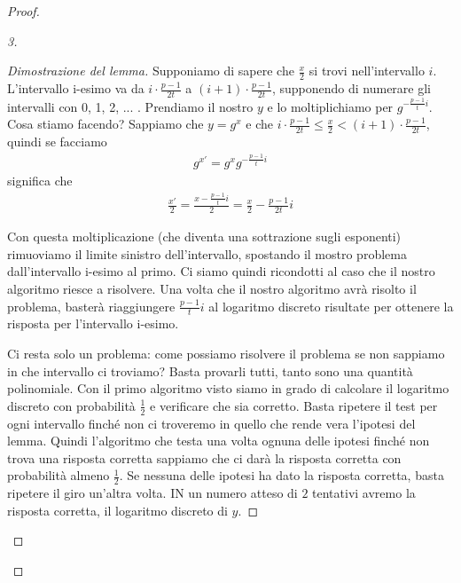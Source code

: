\begin{proof}
\begin{proof}[3]
\begin{proof}[Dimostrazione del lemma]
Supponiamo di sapere che $\frac{x}{2}$ si trovi nell'intervallo $i$. L'intervallo i-esimo va da $i \cdot \frac{p-1}{2t}$ a $(i+1) \cdot \frac{p-1}{2t}$, supponendo di numerare gli intervalli con 0, 1, 2, ... . Prendiamo il nostro $y$ e lo moltiplichiamo per $g^{-\frac{p-1}{t}i}$. Cosa stiamo facendo? Sappiamo che $y=g^x$ e che $i \cdot \frac{p-1}{2t} \le \frac{x}{2} < (i+1) \cdot \frac{p-1}{2t}$, quindi se facciamo 
\begin{align*}
    g^{x'} = g^x g^{-\frac{p-1}{t}i}
\end{align*}
\noindent significa che
\begin{align*}
    \frac{x'}{2} = \frac{x - \frac{p-1}{t}i}{2} = \frac{x}{2} - \frac{p-1}{2t}i
\end{align*}

\noindent Con questa moltiplicazione (che diventa una sottrazione sugli esponenti) rimuoviamo il limite sinistro dell'intervallo, spostando il mostro problema dall'intervallo i-esimo al primo. Ci siamo quindi ricondotti al caso che il nostro algoritmo riesce a risolvere. Una volta che il nostro algoritmo avrà risolto il problema, basterà riaggiungere $\frac{p-1}{t}i$ al logaritmo discreto risultate per ottenere la risposta per l'intervallo i-esimo. 

Ci resta solo un problema: come possiamo risolvere il problema se non sappiamo in che intervallo ci troviamo? Basta provarli tutti, tanto sono una quantità polinomiale. Con il primo algoritmo visto siamo in grado di calcolare il logaritmo discreto con probabilità $\frac{1}{2}$ e verificare che sia corretto. Basta ripetere il test per ogni intervallo finché non ci troveremo in quello che rende vera l'ipotesi del lemma. Quindi l'algoritmo che testa una volta ognuna delle ipotesi finché non trova una risposta corretta sappiamo che ci darà la risposta corretta con probabilità almeno $\frac{1}{2}$. Se nessuna delle ipotesi ha dato la risposta corretta, basta ripetere il giro un'altra volta. IN un numero atteso di $2$ tentativi avremo la risposta corretta, il logaritmo discreto di $y$.
\end{proof}

\end{proof}
\end{proof}














